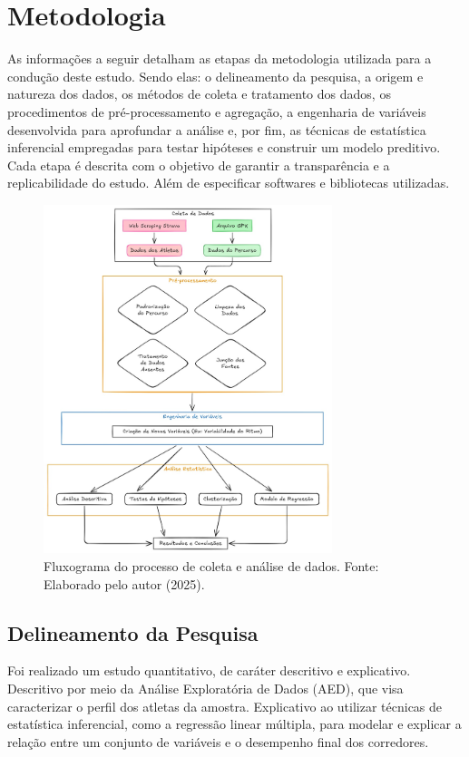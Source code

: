 \chapter{Metodologia}
\label{chap:metodologia}
As informações a seguir detalham as etapas da metodologia utilizada para a condução deste estudo. Sendo elas: o delineamento da pesquisa, a origem e natureza dos dados, os métodos de coleta e tratamento dos dados, os procedimentos de pré-processamento e agregação, a engenharia de variáveis desenvolvida para aprofundar a análise e, por fim, as técnicas de estatística inferencial empregadas para testar hipóteses e construir um modelo preditivo. Cada etapa é descrita com o objetivo de garantir a transparência e a replicabilidade do estudo. Além de especificar softwares e bibliotecas utilizadas.

\begin{figure}[h!]
    \centering
    \includegraphics[width=0.75\textwidth]{Imagens/fluxo_trabalho.png}
    \caption{Fluxograma do processo de coleta e análise de dados. Fonte: Elaborado pelo autor (2025).}
    \label{fig:fluxograma}
\end{figure}

\section{Delineamento da Pesquisa}

Foi realizado um estudo quantitativo, de caráter descritivo e explicativo. Descritivo por meio da Análise Exploratória de Dados (AED), que visa caracterizar o perfil dos atletas da amostra. Explicativo ao utilizar técnicas de estatística inferencial, como a regressão linear múltipla, para modelar e explicar a relação entre um conjunto de variáveis e o desempenho final dos corredores.

